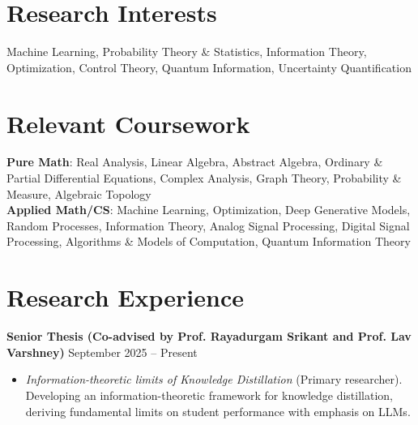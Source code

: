 \documentclass[letterpaper,10pt]{article}
\begin{document}
\section{Research Interests}
    Machine Learning, Probability Theory \& Statistics, Information Theory, Optimization, Control Theory, Quantum Information, Uncertainty Quantification\\
\section{Relevant Coursework}
    \textbf{Pure Math}: Real Analysis, Linear Algebra, Abstract Algebra, Ordinary \& Partial Differential Equations, Complex Analysis, Graph Theory, Probability \& Measure, Algebraic Topology\\
    \vspace{3pt}
    \textbf{Applied Math/CS}: Machine Learning, Optimization, Deep Generative Models, Random Processes, Information Theory, Analog Signal Processing, Digital Signal Processing, Algorithms \& Models of Computation, Quantum Information Theory\\
\section{Research Experience}

\textbf{Senior Thesis (Co-advised by Prof. Rayadurgam Srikant and Prof. Lav Varshney)} \hfill September 2025 -- Present
\begin{itemize}[itemsep=-4pt, parsep=4pt, leftmargin=0.25in]
    \item \textit{Information-theoretic limits of Knowledge Distillation} (Primary researcher).
    Developing an information-theoretic framework for knowledge distillation, deriving fundamental limits on student performance with emphasis on LLMs.
\end{itemize}
\end{document}
